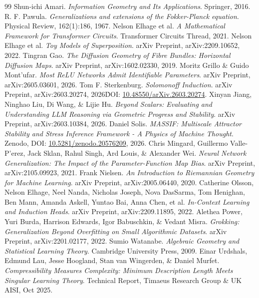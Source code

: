 \documentclass[11pt]{article}
\begin{document}
\begin{thebibliography}{99}
 Shun-ichi Amari. \textit{Information Geometry and Its Applications}. Springer, 2016.
 R. F. Pawula. \textit{Generalizations and extensions of the Fokker-Planck equation}. Physical Review, 162(1):186, 1967.
 Nelson Elhage et al. \textit{A Mathematical Framework for Transformer Circuits}. Transformer Circuits Thread, 2021.
 Nelson Elhage et al. \textit{Toy Models of Superposition}. arXiv Preprint, arXiv:2209.10652, 2022.
 Tingran Gao. \textit{The Diffusion Geometry of Fibre Bundles: Horizontal Diffusion Maps}. arXiv Preprint, arXiv:1602.02330, 2019.
 Moritz Grillo \& Guido Mont'ufar. \textit{Most ReLU Networks Admit Identifiable Parameters}. arXiv Preprint, arXiv:2605.03601, 2026.
 Tom F. Sterkenburg. \textit{Solomonoff Induction}. arXiv Preprint, arXiv:2603.20274, 2026\. DOI: \href{https://arxiv.org/abs/2603.20274}{10.48550/arXiv.2603.20274}.
 Xinyan Jiang, Ninghao Liu, Di Wang, \& Lijie Hu. \textit{Beyond Scalars: Evaluating and Understanding LLM Reasoning via Geometric Progress and Stability}. arXiv Preprint, arXiv:2603.10384, 2026.
 Daniel Solis. \textit{MASSIF: Multiscale Attractor Stability and Stress Inference Framework - A Physics of Machine Thought}. Zenodo, DOI: \href{https://doi.org/10.5281/zenodo.20576209}{10.5281/zenodo.20576209}, 2026.
 Chris Mingard, Guillermo Valle-P'erez, Jack Sklan, Rahul Singh, Ard Louis, \& Alexander Wei. \textit{Neural Network Generalization: The Impact of the Parameter-Function Map Bias}. arXiv Preprint, arXiv:2105.09923, 2021.
 Frank Nielsen. \textit{An Introduction to Riemannian Geometry for Machine Learning}. arXiv Preprint, arXiv:2005.06440, 2020.
 Catherine Olsson, Nelson Elhage, Neel Nanda, Nicholas Joseph, Nova DasSarma, Tom Henighan, Ben Mann, Amanda Askell, Yuntao Bai, Anna Chen, et al. \textit{In-Context Learning and Induction Heads}. arXiv Preprint, arXiv:2209.11895, 2022.
 Alethea Power, Yuri Burda, Harrison Edwards, Igor Babuschkin, \& Vedant Misra. \textit{Grokking: Generalization Beyond Overfitting on Small Algorithmic Datasets}. arXiv Preprint, arXiv:2201.02177, 2022.
 Sumio Watanabe. \textit{Algebraic Geometry and Statistical Learning Theory}. Cambridge University Press, 2009.
 Einar Urdshals, Edmund Lau, Jesse Hoogland, Stan van Wingerden, \& Daniel Murfet. \textit{Compressibility Measures Complexity: Minimum Description Length Meets Singular Learning Theory}. Technical Report, Timaeus Research Group \& UK AISI, Oct 2025.

\end{thebibliography}
\end{document}
